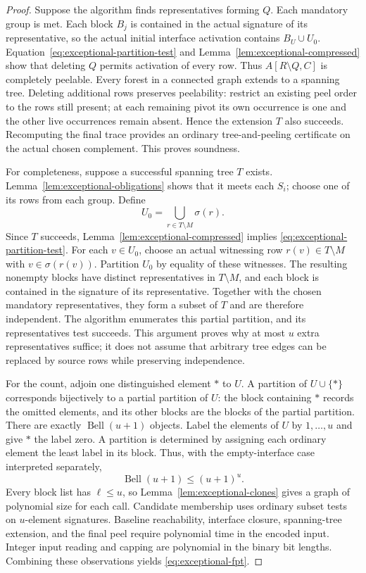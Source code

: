 \begin{proof}
Suppose the algorithm finds representatives forming $Q$.  Each mandatory
group is met.  Each block $B_j$ is contained in the actual signature of
its representative, so the actual initial interface activation contains
$B_U\cup U_0$.  Equation~\eqref{eq:exceptional-partition-test} and
Lemma~\ref{lem:exceptional-compressed} show that deleting $Q$ permits
activation of every row.  Thus $A[R\setminus Q,C]$ is completely peelable.
Every forest in a connected graph extends to a spanning tree.  Deleting
additional rows preserves peelability: restrict an existing peel order
to the rows still present; at each remaining pivot its own occurrence is
one and the other live occurrences remain absent.  Hence the extension
$T$ also succeeds.  Recomputing the final trace provides an ordinary
tree-and-peeling certificate on the actual chosen complement.  This
proves soundness.

For completeness, suppose a successful spanning tree $T$ exists.
Lemma~\ref{lem:exceptional-obligations} shows that it meets each $S_i$;
choose one of its rows from each group.  Define
\[
                   U_0=\bigcup_{r\in T\setminus M}\sigma(r).
\]
Since $T$ succeeds, Lemma~\ref{lem:exceptional-compressed} implies
\eqref{eq:exceptional-partition-test}.  For each $v\in U_0$, choose an
actual witnessing row $r(v)\in T\setminus M$ with
$v\in\sigma(r(v))$.  Partition $U_0$ by equality of these witnesses.
The resulting nonempty blocks have distinct representatives in
$T\setminus M$, and each block is contained in the signature of its
representative.  Together with the chosen mandatory representatives,
they form a subset of $T$ and are therefore independent.  The algorithm
enumerates this partial partition, and its representatives test succeeds.
This argument proves why at most $u$ extra representatives suffice;
it does not assume that arbitrary tree edges can be replaced by source
rows while preserving independence.

For the count, adjoin one distinguished element $\ast$ to $U$.  A
partition of $U\cup\{\ast\}$ corresponds bijectively to a partial
partition of $U$: the block containing $\ast$ records the omitted
elements, and its other blocks are the blocks of the partial partition.
There are exactly $\operatorname{Bell}(u+1)$ objects.  Label the elements
of $U$ by $1,\ldots,u$ and give $\ast$ the label zero.  A partition is
determined by assigning each ordinary element the least label in its
block.  Thus, with the empty-interface case interpreted separately,
\[
                 \operatorname{Bell}(u+1)\leq (u+1)^u.
\]
Every block list has $\ell\leq u$, so
Lemma~\ref{lem:exceptional-clones} gives a graph of polynomial size for
each call.  Candidate membership uses ordinary subset tests on
$u$-element signatures.  Baseline reachability, interface closure,
spanning-tree extension, and the final peel require polynomial time in
the encoded input.  Integer input reading and capping are polynomial in
the binary bit lengths.  Combining these observations yields
\eqref{eq:exceptional-fpt}.
\end{proof}

